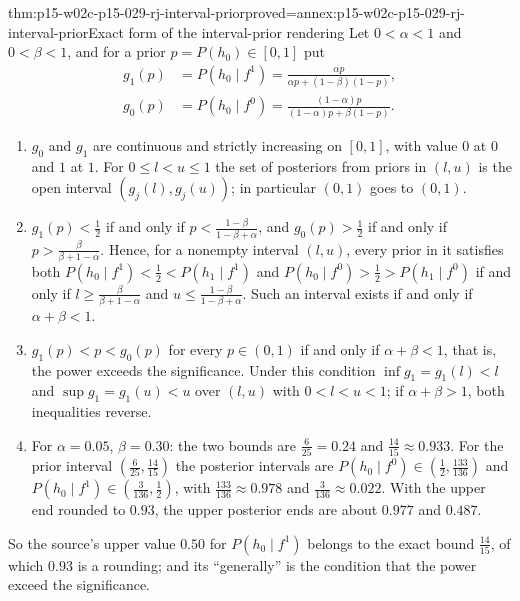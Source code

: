 \begin{hbtheorem}{thm:p15-w02c-p15-029-rj-interval-prior}{proved=annex:p15-w02c-p15-029-rj-interval-prior}{Exact form of the interval-prior rendering}
Let \(0<\alpha<1\) and \(0<\beta<1\), and for a prior \(p=P(h_0)\in[0,1]\) put
\begin{align*}
 g_1(p)&=P(h_0\mid f^1)=\frac{\alpha p}{\alpha p+(1-\beta)(1-p)},\\
 g_0(p)&=P(h_0\mid f^0)=\frac{(1-\alpha)p}{(1-\alpha)p+\beta(1-p)}.
\end{align*}
\begin{enumerate}
\item \(g_0\) and \(g_1\) are continuous and strictly increasing on
  \([0,1]\), with value \(0\) at \(0\) and \(1\) at \(1\). For
  \(0\le l<u\le1\) the set of posteriors from priors in \((l,u)\) is the
  open interval \((g_j(l),g_j(u))\); in particular \((0,1)\) goes to
  \((0,1)\).
\item \(g_1(p)<\tfrac12\) if and only if \(p<\frac{1-\beta}{1-\beta+\alpha}\),
  and \(g_0(p)>\tfrac12\) if and only if \(p>\frac{\beta}{\beta+1-\alpha}\).
  Hence, for a nonempty interval \((l,u)\), every prior in it satisfies
  both \(P(h_0\mid f^1)<\tfrac12<P(h_1\mid f^1)\) and
  \(P(h_0\mid f^0)>\tfrac12>P(h_1\mid f^0)\) if and only if
  \(l\ge\frac{\beta}{\beta+1-\alpha}\) and
  \(u\le\frac{1-\beta}{1-\beta+\alpha}\). Such an interval exists if and
  only if \(\alpha+\beta<1\).
\item \(g_1(p)<p<g_0(p)\) for every \(p\in(0,1)\) if and only if
  \(\alpha+\beta<1\), that is, the power exceeds the significance. Under
  this condition \(\inf g_1=g_1(l)<l\) and \(\sup g_1=g_1(u)<u\) over
  \((l,u)\) with \(0<l<u<1\); if \(\alpha+\beta>1\), both inequalities
  reverse.
\item For \(\alpha=0.05\), \(\beta=0.30\): the two bounds are
  \(\frac{6}{25}=0.24\) and \(\frac{14}{15}\approx0.933\). For the prior
  interval \((\frac{6}{25},\frac{14}{15})\) the posterior intervals are
  \(P(h_0\mid f^0)\in(\tfrac12,\tfrac{133}{136})\) and
  \(P(h_0\mid f^1)\in(\tfrac{3}{136},\tfrac12)\), with
  \(\tfrac{133}{136}\approx0.978\) and \(\tfrac{3}{136}\approx0.022\).
  With the upper end rounded to \(0.93\), the upper posterior ends are
  about \(0.977\) and \(0.487\).
\end{enumerate}
\end{hbtheorem}

So the source's upper value \(0.50\) for \(P(h_0\mid f^1)\) belongs to
the exact bound \(\tfrac{14}{15}\), of which \(0.93\) is a rounding; and
its ``generally'' is the condition that the power exceed the
significance.

